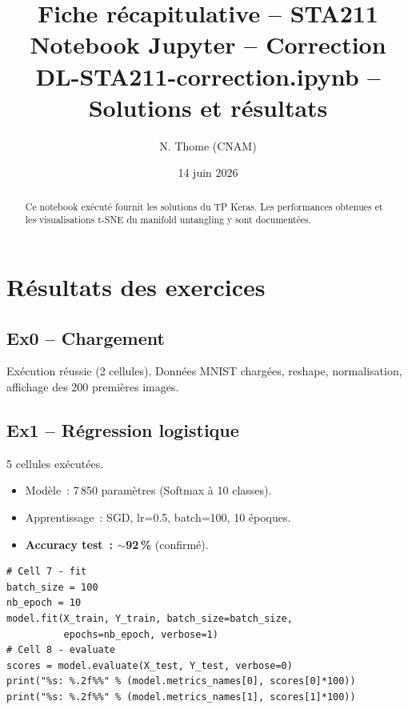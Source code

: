 \documentclass[a4paper,11pt]{article}
\title{\textbf{Fiche r\'ecapitulative -- STA211}\\[4pt]
\large Notebook Jupyter -- Correction \\[2pt]
\small DL-STA211-correction.ipynb -- Solutions et r\'esultats}
\author{N. Thome (CNAM)}
\date{14 juin 2026}
\begin{document}
\maketitle
\thispagestyle{empty}

\begin{abstract}
Ce notebook ex\'ecut\'e fournit les solutions du TP Keras.
Les performances obtenues et les visualisations t-SNE du manifold
untangling y sont document\'ees.
\end{abstract}

\vfill
\tableofcontents
\newpage

\section{R\'esultats des exercices}

\subsection{Ex0 -- Chargement}

Ex\'ecution r\'eussie (2 cellules). Donn\'ees MNIST charg\'ees,
reshape, normalisation, affichage des 200 premi\`eres images.

\subsection{Ex1 -- R\'egression logistique}

5 cellules ex\'ecut\'ees.

\begin{itemize}
  \item Mod\`ele~: 7\,850 param\`etres (Softmax \`a 10 classes).
  \item Apprentissage~: SGD, lr=0.5, batch=100, 10 \'epoques.
  \item \textbf{Accuracy test~: $\sim$92\,\%} (confirm\'e).
\end{itemize}

\begin{lstlisting}
# Cell 7 - fit
batch_size = 100
nb_epoch = 10
model.fit(X_train, Y_train, batch_size=batch_size,
          epochs=nb_epoch, verbose=1)
# Cell 8 - evaluate
scores = model.evaluate(X_test, Y_test, verbose=0)
print("%s: %.2f%%" % (model.metrics_names[0], scores[0]*100))
print("%s: %.2f%%" % (model.metrics_names[1], scores[1]*100))
\end{lstlisting}
\end{document}
